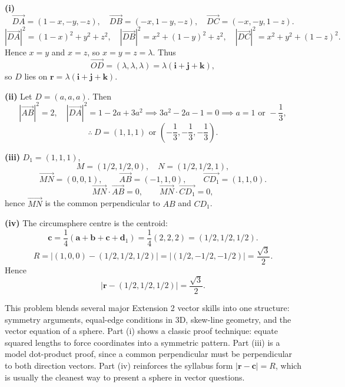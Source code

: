 \begin{solution}
\textbf{(i)}
\[
\vec{DA}=(1-x,-y,-z),\quad
\vec{DB}=(-x,1-y,-z),\quad
\vec{DC}=(-x,-y,1-z).
\]
\[
|\vec{DA}|^2=(1-x)^2+y^2+z^2,\quad
|\vec{DB}|^2=x^2+(1-y)^2+z^2,\quad
|\vec{DC}|^2=x^2+y^2+(1-z)^2.
\]
Hence $x=y$ and $x=z$, so $x=y=z=\lambda$. Thus
\[
\vec{OD}=(\lambda,\lambda,\lambda)=\lambda(\mathbf{i}+\mathbf{j}+\mathbf{k}),
\]
so $D$ lies on $\mathbf{r}=\lambda(\mathbf{i}+\mathbf{j}+\mathbf{k})$.

\textbf{(ii)} Let $D=(a,a,a)$. Then
\[
|\vec{AB}|^2=2,\quad |\vec{DA}|^2=1-2a+3a^2
\implies 3a^2-2a-1=0
\implies a=1 \text{ or } -\frac13,
\]
\[
\therefore\ D=(1,1,1)\text{ or }\left(-\frac13,-\frac13,-\frac13\right).
\]

\textbf{(iii)} $D_1=(1,1,1)$,
\[
M=\left(1/2,1/2,0\right),\quad N=\left(1/2,1/2,1\right),
\]
\[
\vec{MN}=(0,0,1),\qquad
\vec{AB}=(-1,1,0),\qquad
\vec{CD_1}=(1,1,0).
\]
\[
\vec{MN}\cdot\vec{AB}=0,\qquad \vec{MN}\cdot\vec{CD_1}=0,
\]
hence $\vec{MN}$ is the common perpendicular to $AB$ and $CD_1$.

\textbf{(iv)} The circumsphere centre is the centroid:
\[
\mathbf{c}=\frac14(\mathbf{a}+\mathbf{b}+\mathbf{c}+\mathbf{d}_1)
=\frac14(2,2,2)=(1/2,1/2,1/2).
\]
\[
R=|(1,0,0)-(1/2,1/2,1/2)|
=|(1/2,-1/2,-1/2)|
=\frac{\sqrt3}{2}.
\]
Hence
\[
|\mathbf{r}-(1/2,1/2,1/2)|=\frac{\sqrt3}{2}.
\]
\end{solution}

\begin{takeaways}
This problem blends several major Extension 2 vector skills into one structure: symmetry arguments, equal-edge conditions in 3D, skew-line geometry, and the vector equation of a sphere. Part (i) shows a classic proof technique: equate squared lengths to force coordinates into a symmetric pattern. Part (iii) is a model dot-product proof, since a common perpendicular must be perpendicular to both direction vectors. Part (iv) reinforces the syllabus form $|\mathbf{r} - \mathbf{c}| = R$, which is usually the cleanest way to present a sphere in vector questions.
\end{takeaways}

\vspace{1em}

